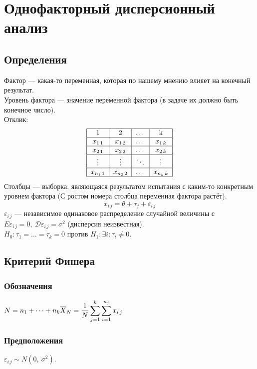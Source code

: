 \documentclass[12pt, a4paper]{article}
\newcommand{\dev}{\mathcal{D}}
\begin{document}
\section*{Однофакторный дисперсионный анализ}
\subsection*{Определения}
Фактор --- какая-то переменная, которая по нашему мнению влияет на конечный результат.\\
Уровень фактора --- значение переменной фактора (в задаче их должно быть конечное число).\\
Отклик:
\[\begin{tabular}{|c|c|c|c|}
    \hline
    1 & 2 & $\dots$ & k\\
    \hline
    $x_{1\, 1}$ & $x_{1\, 2}$ & $\dots$ & $x_{1\, k}$\\
    \hline
    $x_{2\, 1}$ & $x_{2\, 2}$ & $\dots$ & $x_{2\, k}$\\
    \hline
    $\vdots$ & $\vdots$ & $\ddots$ & $\vdots$\\
    \hline
    $x_{{n_1}\, 1}$ & $x_{{n_2}\, 2}$ & $\dots$ & $x_{{n_k}\, k}$\\
    \hline
\end{tabular}\]
Столбцы --- выборка, являющаяся результатом испытания с каким-то конкретным уровнем фактора (С ростом номера столбца переменная фактора растёт).
\[x_{i\, j} = \theta + \tau_j + \varepsilon_{i\, j}\]
$\varepsilon_{i\, j}$ --- независимое одинаковое распределение случайной величины с $E\varepsilon_{i\, j} = 0,\ \dev \varepsilon_{i\, j} = \sigma^2$ (дисперсия неизвестная).\\
$H_0: \tau_1 = \dots = \tau_k = 0$ против $ H_1: \exists i : \tau_i \neq 0 $.
\subsection*{Критерий Фишера}
\subsubsection*{Обозначения}
$N = n_1 + \dots + n_k\\
\overline{X}_N = \displaystyle \frac{1}{N} \sum_{j = 1}^{k} \sum_{i = 1}^{n_j} x_{i\, j}\\$

\subsubsection*{Предположения}
$\varepsilon_{i\, j} \sim N(0,\ \sigma^2)$.
\end{document}
